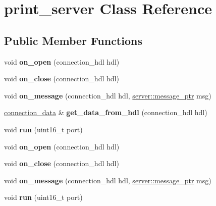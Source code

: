 \hypertarget{classprint__server}{}\section{print\+\_\+server Class Reference}
\label{classprint__server}
\subsection*{Public Member Functions}
\begin{DoxyCompactItemize}
\item 
void {\bfseries on\+\_\+open} (connection\+\_\+hdl hdl)\hypertarget{classprint__server_adc26c2f38649bdbbe97531dde369ad74}{}\label{classprint__server_adc26c2f38649bdbbe97531dde369ad74}

\item 
void {\bfseries on\+\_\+close} (connection\+\_\+hdl hdl)\hypertarget{classprint__server_abb31736075d42768a36f1d953866b1c6}{}\label{classprint__server_abb31736075d42768a36f1d953866b1c6}

\item 
void {\bfseries on\+\_\+message} (connection\+\_\+hdl hdl, \hyperlink{classwebsocketpp_1_1endpoint_a585ecbbfd9689d4e4229e4c8378bd672}{server\+::message\+\_\+ptr} msg)\hypertarget{classprint__server_a08d4b374fa69846cb78ecf54b40cfd70}{}\label{classprint__server_a08d4b374fa69846cb78ecf54b40cfd70}

\item 
\hyperlink{structconnection__data}{connection\+\_\+data} \& {\bfseries get\+\_\+data\+\_\+from\+\_\+hdl} (connection\+\_\+hdl hdl)\hypertarget{classprint__server_a887cff1be2a37977309ee16cfcb01c5c}{}\label{classprint__server_a887cff1be2a37977309ee16cfcb01c5c}

\item 
void {\bfseries run} (uint16\+\_\+t port)\hypertarget{classprint__server_a724db97a6c441b5db090f6274c6112d8}{}\label{classprint__server_a724db97a6c441b5db090f6274c6112d8}

\item 
void {\bfseries on\+\_\+open} (connection\+\_\+hdl hdl)\hypertarget{classprint__server_adc26c2f38649bdbbe97531dde369ad74}{}\label{classprint__server_adc26c2f38649bdbbe97531dde369ad74}

\item 
void {\bfseries on\+\_\+close} (connection\+\_\+hdl hdl)\hypertarget{classprint__server_abb31736075d42768a36f1d953866b1c6}{}\label{classprint__server_abb31736075d42768a36f1d953866b1c6}

\item 
void {\bfseries on\+\_\+message} (connection\+\_\+hdl hdl, \hyperlink{classwebsocketpp_1_1endpoint_a585ecbbfd9689d4e4229e4c8378bd672}{server\+::message\+\_\+ptr} msg)\hypertarget{classprint__server_a08d4b374fa69846cb78ecf54b40cfd70}{}\label{classprint__server_a08d4b374fa69846cb78ecf54b40cfd70}

\item 
void {\bfseries run} (uint16\+\_\+t port)\hypertarget{classprint__server_a724db97a6c441b5db090f6274c6112d8}{}\label{classprint__server_a724db97a6c441b5db090f6274c6112d8}

\end{DoxyCompactItemize}

